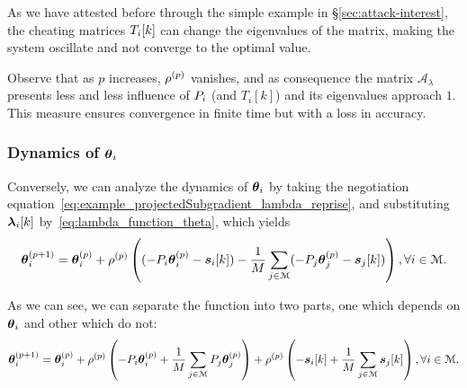 \documentclass[../main.tex]{subfiles}
\begin{document}
As we have attested before through the simple example in \S\ref{sec:attack-interest}, the cheating matrices $T_{i}[k]$ can change the eigenvalues of the matrix, making the system oscillate and not converge to the optimal value.

\begin{remark}
  Observe that as $p$ increases, $\rho^{(p)}$ vanishes, and as consequence the matrix $\mathcal{A}_{\lambda}$ presents less and less influence of ${P}_{i}$ (and $T_i[k]$) and its eigenvalues approach $1$.
  This measure ensures convergence in finite time but with a loss in accuracy.
\end{remark}


\subsubsection{Dynamics of $\boldsymbol{\theta}_i$}
Conversely, we can analyze the dynamics of $\boldsymbol{\theta}_i$ by
taking the negotiation equation~\eqref{eq:example_projectedSubgradient_lambda_reprise},
and substituting $\lambdaik$ by~\eqref{eq:lambda_function_theta}, which yields
\begin{equation}
  \label{eq:negotiation_equation_substituting}
 \thetai\pplusone=\thetai\p+\rho\p\left((-\Plin\thetai\p-\sik)-\frac{1}{M}\sum_{j\in\set{M}}(-\Plin[j]\vec{\theta}_{j}\p-\vec{s}_{j}[k])\right),\forall i\in\set{M}.
\end{equation}

As we can see, we can separate the function into two parts, one which depends on $\boldsymbol{\theta}_i$ and other which do not:
\begin{equation}
  \label{eq:negotiation_equation_substituting_organizing}
 \thetai\pplusone=\thetai\p+\rho\p\left(-\Plin\thetai\p+\frac{1}{M}\sum_{j\in\set{M}}\Plin[j]\vec{\theta}_{j}\p\right)+\rho\p\left(-\sik+\frac{1}{M}\sum_{j\in\set{M}}\vec{s}_{j}[k]\right),\forall i\in\set{M}.
\end{equation}
\end{document}
